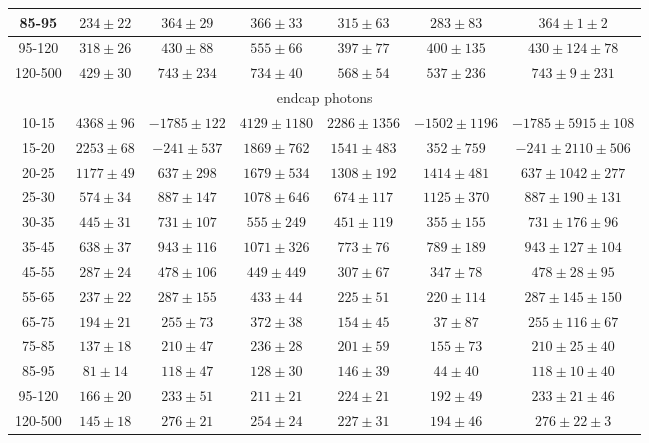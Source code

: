\begin{table}[h]
\begin{center}
\begin{tabular}{|c|c|c|c|c|c|c|}
    85-95 & $234\pm22$ & $364\pm29$ & $366\pm33$ & $315\pm63$ & $283\pm83$ &$364\pm1\pm2$  \\ \hline
    95-120 & $318\pm26$ & $430\pm88$ & $555\pm66$ & $397\pm77$ & $400\pm135$ &$430\pm124\pm78$  \\ \hline
    120-500 & $429\pm30$ & $743\pm234$ & $734\pm40$ & $568\pm54$ & $537\pm236$ &$743\pm9\pm231$  \\ \hline
    \multicolumn{7}{|c|}{endcap photons} \\ \hline
     10-15 & $4368\pm96$ & $-1785\pm122$ & $4129\pm1180$ & $2286\pm1356$ & $-1502\pm1196$ &$-1785\pm5915\pm108$  \\ \hline
    15-20 & $2253\pm68$ & $-241\pm537$ & $1869\pm762$ & $1541\pm483$ & $352\pm759$ &$-241\pm2110\pm506$  \\ \hline
    20-25 & $1177\pm49$ & $637\pm298$ & $1679\pm534$ & $1308\pm192$ & $1414\pm481$ &$637\pm1042\pm277$  \\ \hline
    25-30 & $574\pm34$ & $887\pm147$ & $1078\pm646$ & $674\pm117$ & $1125\pm370$ &$887\pm190\pm131$  \\ \hline
    30-35 & $445\pm31$ & $731\pm107$ & $555\pm249$ & $451\pm119$ & $355\pm155$ &$731\pm176\pm96$  \\ \hline
    35-45 & $638\pm37$ & $943\pm116$ & $1071\pm326$ & $773\pm76$ & $789\pm189$ &$943\pm127\pm104$  \\ \hline
    45-55 & $287\pm24$ & $478\pm106$ & $449\pm449$ & $307\pm67$ & $347\pm78$ &$478\pm28\pm95$  \\ \hline
    55-65 & $237\pm22$ & $287\pm155$ & $433\pm44$ & $225\pm51$ & $220\pm114$ &$287\pm145\pm150$  \\ \hline
    65-75 & $194\pm21$ & $255\pm73$ & $372\pm38$ & $154\pm45$ & $37\pm87$ &$255\pm116\pm67$  \\ \hline
    75-85 & $137\pm18$ & $210\pm47$ & $236\pm28$ & $201\pm59$ & $155\pm73$ &$210\pm25\pm40$  \\ \hline
    85-95 & $81\pm14$ & $118\pm47$ & $128\pm30$ & $146\pm39$ & $44\pm40$ &$118\pm10\pm40$  \\ \hline
    95-120 & $166\pm20$ & $233\pm51$ & $211\pm21$ & $224\pm21$ & $192\pm49$ &$233\pm21\pm46$  \\ \hline
    120-500 & $145\pm18$ & $276\pm21$ & $254\pm24$ & $227\pm31$ & $194\pm46$ &$276\pm22\pm3$  \\ \hline
  \end{tabular}
  \label{tab:diff_ways_to_fit_phoEt_electron}
  \end{center}
\end{table}


